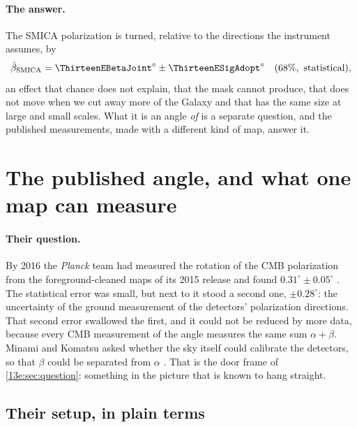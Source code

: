 \paragraph{The answer.} The SMICA polarization is turned, relative to the directions the instrument
assumes, by
\begin{equation}
  \hat\beta_{\rm SMICA}=\ThirteenEBetaJoint^\circ\pm\ThirteenESigAdopt^\circ\quad(68\%,\ \text{statistical}),
\end{equation}
an effect that chance does not explain, that the mask cannot produce, that does not move when we cut away
more of the Galaxy and that has the same size at large and small scales. What it is an angle \emph{of} is a
separate question, and the published measurements, made with a different kind of map, answer it.
\section{The published angle, and what one map can measure}
\label{13e:sec:compare}

\paragraph{Their question.} By 2016 the \textit{Planck} team had measured the rotation of the CMB polarization
from the foreground-cleaned maps of its 2015 release and found $0.31^\circ\pm0.05^\circ$
\cite{PlanckIntXLIX2016}. The statistical error was small, but next to it stood a second one, $\pm0.28^\circ$:
the uncertainty of the ground measurement of the detectors' polarization directions. That second error
swallowed the first, and it could not be reduced by more data, because every CMB measurement of the angle
measures the same sum $\alpha+\beta$. Minami and Komatsu asked whether the sky itself could calibrate the
detectors, so that $\beta$ could be separated from $\alpha$ \cite{Minami2019,MinamiKomatsu2020}. That is
the door frame of \cref{13e:sec:question}: something in the picture that is known to hang straight.

\subsection{Their setup, in plain terms}
\label{13e:sec:their-setup}

